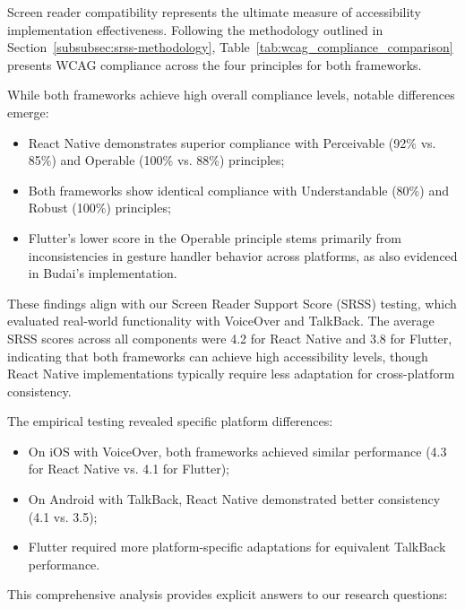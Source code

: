 Screen reader compatibility represents the ultimate measure of accessibility implementation effectiveness. Following the methodology outlined in Section~\ref{subsubsec:srss-methodology}, Table~\ref{tab:wcag_compliance_comparison} presents WCAG compliance across the four principles for both frameworks.

While both frameworks achieve high overall compliance levels, notable differences emerge:

\begin{itemize}
    \item React Native demonstrates superior compliance with Perceivable (92\% vs. 85\%) and Operable (100\% vs. 88\%) principles;
    \item Both frameworks show identical compliance with Understandable (80\%) and Robust (100\%) principles;
    \item Flutter's lower score in the Operable principle stems primarily from inconsistencies in gesture handler behavior across platforms, as also evidenced in Budai's implementation.
\end{itemize}

These findings align with our Screen Reader Support Score (SRSS) testing, which evaluated real-world functionality with VoiceOver and TalkBack. The average SRSS scores across all components were 4.2 for React Native and 3.8 for Flutter, indicating that both frameworks can achieve high accessibility levels, though React Native implementations typically require less adaptation for cross-platform consistency.

The empirical testing revealed specific platform differences:

\begin{itemize}
    \item On iOS with VoiceOver, both frameworks achieved similar performance (4.3 for React Native vs. 4.1 for Flutter);
    \item On Android with TalkBack, React Native demonstrated better consistency (4.1 vs. 3.5);
    \item Flutter required more platform-specific adaptations for equivalent TalkBack performance.
\end{itemize}

This comprehensive analysis provides explicit answers to our research questions:

